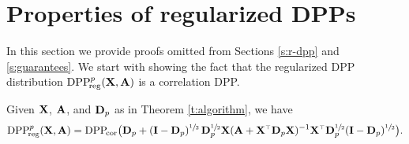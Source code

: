 \documentclass[11pt]{article}
\begin{document}
\section{Properties of regularized DPPs}
\label{a:proofs}
In this section we provide proofs omitted from Sections \ref{s:r-dpp}
and \ref{s:guarantees}. We start with showing the fact that the
regularized DPP distribution ${{\mathrm{DPP}}_{\!\mathrm{reg}}^{p}}(\mathbf X,\mathbf A)$ is a correlation DPP.
\begin{lemma}
  Given $\mathbf X$, $\mathbf A$, and $\mathbf D_p$ as in Theorem \ref{t:algorithm}, we have
  \begin{align*}
    \DPPreg{p}(\X,\A)= \DPPcor\big(\D_p +
    (\I-\D_p)^{\sfrac12}\,\D_p^{\sfrac12}\X(\A+\X^\top\D_p\X)^{-1}\X^\top\D_p^{\sfrac12}(\I-\D_p)^{\sfrac12}\big).
    \end{align*}
  \end{lemma}
\end{document}
